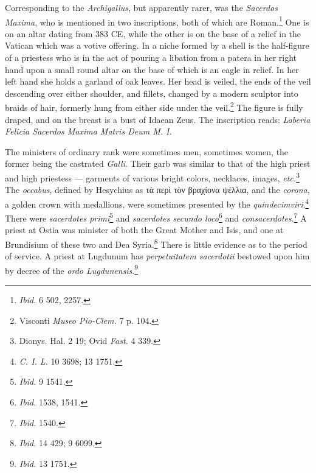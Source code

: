 \documentclass[a4paper, 11pt, oneside, polutonikogreek, french]{article}
\begin{document}
Corresponding to the \emph{Archigallus}, but apparently rarer, was the \emph{Sacerdos Maxima}, who is mentioned in two inscriptions, both of which are Roman.\footnote{\emph{Ibid.} 6 502, 2257.} One is on an altar dating from 383 \textsc{CE}, while the other is on the base of a relief in the Vatican which was a votive offering. In a niche formed by a shell is the half-figure of a priestess who is in the act of pouring a libation from a patera in her right hand upon a small round altar on the base of which is an eagle in relief. In her left hand she holds a garland of oak leaves. Her head is veiled, the ends of the veil descending over either shoulder, and fillets, changed by a modern sculptor into braids of hair, formerly hung from either side under the veil.\footnote{Visconti \emph{Museo Pio-Clem.} 7 p. 104.} The figure is fully draped, and on the breast is a bust of Idaean Zeus. The inscription reads: \emph{Laberia Felicia Sacerdos Maxima Matris Deum M. I.}

The ministers of ordinary rank were sometimes men, sometimes women, the former being the castrated \emph{Galli}. Their garb was similar to that of the high priest and high priestess --- garments of various bright colors, necklaces, images, \emph{etc.}\footnote{Dionys. Hal. 2 19; Ovid \emph{Fast.} 4 339.} The \emph{occabus}, defined by Hesychius as τὰ περὶ τὸν βραχίονα ψέλλια, and the \emph{corona}, a golden crown with medallions, were sometimes presented by the \emph{quindecimviri}.\footnote{\emph{C. I. L.} 10 3698; 13 1751.} There were \emph{sacerdotes primi}\footnote{\emph{Ibid.} 9 1541.} and \emph{sacerdotes secundo loco}\footnote{\emph{Ibid.} 1538, 1541.} and \emph{consacerdotes}.\footnote{\emph{Ibid.} 1540.} A priest at Ostia was minister of both the Great Mother and Isis, and one at Brundisium of these two and Dea Syria.\footnote{\emph{Ibid.} 14 429; 9 6099.} There is little evidence as to the period of service. A priest at Lugdunum has \emph{perpetuitatem sacerdotii} bestowed upon him by decree of the \emph{ordo Lugdunensis}.\footnote{\emph{Ibid.} 13 1751.}
\end{document}
